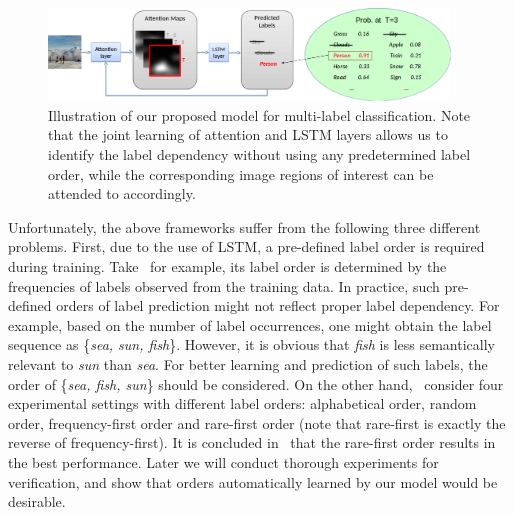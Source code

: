 \documentclass[letterpaper]{article} %
\begin{document}
\begin{figure}[t!]
	\centering
	\includegraphics[width=0.95\textwidth]{./intro_fig.png}
	\caption{Illustration of our proposed model for multi-label classification. Note that the joint learning of attention and LSTM layers allows us to identify the label dependency without using any predetermined label order, while the corresponding image regions of interest can be attended to accordingly.}
	\label{fig:1}
\end{figure}

Unfortunately, the above frameworks suffer from the following three different problems. First, due to the use of LSTM, a pre-defined label order is required during training. Take~\cite{wang2016cnn} for example, its label order is determined by the frequencies of labels observed from the training data. In practice, such pre-defined orders of label prediction might not reflect proper label dependency. For example, based on the number of label occurrences, one might obtain the label sequence as \{\emph{sea, sun, fish}\}. However, it is obvious that \emph{fish} is less semantically relevant to \emph{sun} than \emph{sea}. For better learning and prediction of such labels, the order of \{\emph{sea, fish, sun}\} should be considered. On the other hand,~\cite{jin2016annotation} consider four experimental settings with different label orders: alphabetical order, random order, frequency-first order and rare-first order (note that rare-first is exactly the reverse of frequency-first). It is concluded in~\cite{jin2016annotation} that the rare-first order results in the best performance. Later we will conduct thorough experiments for verification, and show that orders automatically learned by our model would be desirable.
\end{document}
